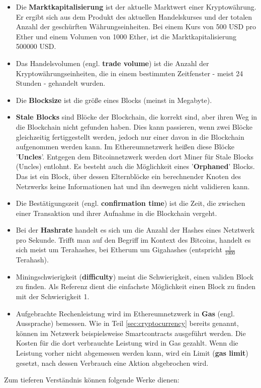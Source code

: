 \begin{itemize}
\item Die \textbf{Marktkapitalisierung} ist der aktuelle Marktwert einer Kryptowährung. Er ergibt sich aus dem Produkt des aktuellen Handelskurses und der totalen Anzahl der geschürften Währungseinheiten. Bei einem Kurs von 500 USD pro Ether und einem Volumen von 1000 Ether, ist die Marktkapitalisierung 500000 USD.
\item Das Handelsvolumen (engl. \textbf{trade volume}) ist die Anzahl der Kryptowährungseinheiten, die in einem bestimmten Zeitfenster - meist 24 Stunden - gehandelt wurden.
\item Die \textbf{Blocksize} ist die größe eines Blocks (meinst in Megabyte).
\item \textbf{Stale Blocks} sind Blöcke der Blockchain, die korrekt sind, aber ihren Weg in die Blockchain nicht gefunden haben. Dies kann passieren, wenn zwei Blöcke gleichzeitig fertiggestellt werden, jedoch nur einer davon in die Blockchain aufgenommen werden kann.\citep{bitcoin_project_stale_2017} Im Ethereumnetzwerk heißen diese Blöcke '\textbf{Uncles}'. Entgegen dem Bitcoinnetzwerk werden dort Miner für Stale Blocks (Uncles) entlohnt.\citep{jdebunt_what_2017} Es besteht auch die Möglichkeit eines '\textbf{Orphaned}' Blocks. Das ist ein Block, über dessen Elternblöcke ein berechnender Knoten des Netzwerks keine Informationen hat und ihn deswegen nicht validieren kann.\citep{bitcoin_project_orphan_2017}
\item Die Bestätigungszeit (engl. \textbf{confirmation time}) ist die Zeit, die zwischen einer Transaktion und ihrer Aufnahme in die Blockchain vergeht.\citep{kumar_cryptocurrency_2017}
\item Bei der \textbf{Hashrate} handelt es sich um die Anzahl der Hashes eines Netztwerk pro Sekunde. Trifft man auf den Begriff im Kontext des Bitcoins, handelt es sich meist um Terahashes, bei Etherum um Gigahashes (entspricht $ \frac{1}{1000}$ Terahash).\citep{kumar_cryptocurrency_2017}
\item Miningschwierigkeit (\textbf{difficulty}) meint die Schwierigkeit, einen validen Block zu finden. Als Referenz dient die einfachste Möglichkeit einen Block zu finden mit der Schwierigkeit 1.\citep{bitcoin_project_difficulty_2017}
\item Aufgebrachte Rechenleistung wird im Ethereumnetzwerk in \textbf{Gas} (engl. Aussprache) bemessen. Wie in Teil \ref{sec:cryptocurrency} bereits genannt, können im Netzwerk beispielsweise Smartcontracts ausgeführt werden. Die Kosten für die dort verbrauchte Leistung wird in Gas gezahlt. Wenn die Leistung vorher nicht abgemessen werden kann, wird ein Limit (\textbf{gas limit}) gesetzt, nach dessen Verbrauch eine Aktion abgebrochen wird.\citep[S.~4]{wood_ethereum:_2014}

\end{itemize}
Zum tieferen Verständnis können folgende Werke dienen:

